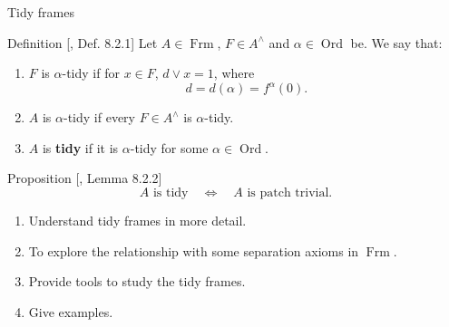 \documentclass[compress,12pt]{beamer}
\DeclareMathOperator{\Frm}{Frm}
\DeclareMathOperator{\Ord}{Ord}
\begin{document}
\begin{frame}{Tidy frames}
\begin{block}{Definition [\cite{R.S.3}, Def. 8.2.1]}
Let $A\in \Frm$, $F\in A^\wedge$ and $\alpha\in \Ord$ be. We say that:
\begin{enumerate}
    \item $F$ is $\alpha$-tidy if for $x\in F$, $d\vee x=1$, where
    \[
    d=d(\alpha)=f^\alpha(0).
    \]
    \item $A$ is $\alpha$-tidy if every $F\in A^\wedge$ is $\alpha$-tidy.
    \item $A$ is \textbf{tidy} if it is $\alpha$-tidy for some $\alpha\in \Ord$.
\end{enumerate}
\end{block}

\begin{block}{Proposition [\cite{R.S.3}, Lemma 8.2.2]}
\[
    A \mbox{ is tidy}\quad \iff\quad A \mbox{ is patch trivial}.
\]
\end{block}
\end{frame}

\begin{frame}
      \begin{enumerate}
        \item Understand tidy frames in more detail.
        \item To explore the relationship with some separation axioms in $\Frm$.
        \item Provide tools to study the tidy frames.
        \item Give examples.
      \end{enumerate}
\end{frame}
\end{document}
